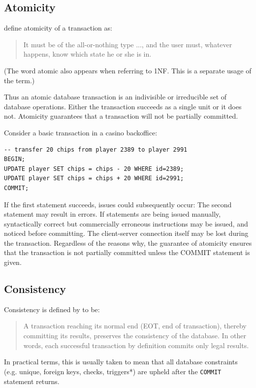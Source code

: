 \documentclass[slides]{pgnotes}
\begin{document}
\subsection{Atomicity}
\label{sec:atomicity}

\citet{haerder:1983:principles} define atomicity of a transaction as:
\begin{quotation}
  It must be of the all-or-nothing type ..., and the user must, whatever happens, know which state he or she is in.
\end{quotation}
(The word atomic also appears when referring to 1NF. This is a separate usage of the term.)

Thus an atomic database transaction is an indivisible or irreducible set of database operations.
Either the transaction succeeds as a single unit or it does not.
Atomicity guarantees that a transaction will not be partially committed.

Consider a basic transaction in a casino backoffice: 
\begin{verbatim}
-- transfer 20 chips from player 2389 to player 2991
BEGIN; 
UPDATE player SET chips = chips - 20 WHERE id=2389;
UPDATE player SET chips = chips + 20 WHERE id=2991;
COMMIT;
\end{verbatim}
If the first statement succeeds, issues could subsequently occur:
The second statement may result in errors.
If statements are being issued manually, syntactically correct but commercially erroneous instructions may be issued, and noticed before committing.
The client-server connection itself may be lost during the transaction.
Regardless of the reasons why, the guarantee of atomicity ensures that the transaction is not partially committed unless the COMMIT statement is given.


\subsection{Consistency}
\label{sec:consistency}

Consistency is defined by \citet{haerder:1983:principles} to be:
\begin{quotation}
  A transaction reaching its normal end (EOT, end of transaction), thereby committing its results, preserves the consistency of the database.
  In other words, each successful transaction by definition commits only legal results.
\end{quotation}

In practical terms, this is usually taken to mean that all database constraints (e.g. unique, foreign keys, checks, triggers*) are upheld after the \texttt{COMMIT} statement returns.
\end{document}
